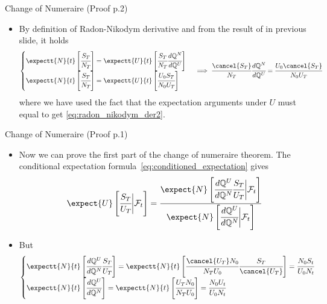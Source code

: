 \documentclass{beamer}
\begin{document}
\begin{frame}{Change of Numeraire (Proof p.2)}
	\begin{itemize}
	\item By definition of Radon-Nikodym derivative and from the result of in previous slide, it holds
  \begin{equation*}
  	\begin{cases}
    \expectt{N}{t}\left[\cfrac{S_T}{N_T}\right] =\expectt{U}{t}\left[\cfrac{S_T}{N_T} \cfrac{d\mathbb{Q}^N}{d\mathbb{Q}^U}\right] \\
    \expectt{N}{t}\left[\cfrac{S_T}{N_T}\right] =\expectt{U}{t}\left[\cfrac{U_0 S_T}{N_0 U_T}\right]
    \end{cases}\implies
	\cfrac{\cancel{S_T}}{N_T} \cfrac{d\mathbb{Q}^N}{d\mathbb{Q}^U} = \cfrac{U_0 \cancel{S_T}}{N_0 U_T}
  \end{equation*}
	where we have used the fact that the expectation arguments under $U$ must equal to get \cref{eq:radon_nikodym_der2}. 
  \end{itemize}
\end{frame}

\begin{frame}{Change of Numeraire (Proof p.1)}
  \begin{itemize}
  \item<1-> Now we can prove the first part of the change of numeraire theorem. The conditional expectation formula~\cref{eq:conditioned_expectation} gives
    \begin{equation*}
      \expect{U}\left[\cfrac{S_T}{U_T}\bigg|\mathcal{F}_t\right]=\cfrac{\expect{N}\left[\cfrac{d\mathbb{Q}^U}{d\mathbb{Q}^N}\cfrac{S_T}{U_T}\bigg|\mathcal{F}_t\right]}{\expect{N}\left[\cfrac{d\mathbb{Q}^U}{d\mathbb{Q}^N}\bigg|\mathcal{F}_t\right]}
    \end{equation*}
  \item<2-> But 
    \begin{equation*}
      \begin{cases}
	\expectt{N}{t}\left[\cfrac{d\mathbb{Q}^U}{d\mathbb{Q}^N}\cfrac{S_T}{U_T}\right]= \expectt{N}{t}\left[\cfrac{\cancel{U_T} N_0}{N_T U_0}\cfrac{S_T}{\cancel{U_T}}\right]=\cfrac{N_0 S_t}{U_0 N_t} \\
	\expectt{N}{t}\left[\cfrac{d\mathbb{Q}^U}{d\mathbb{Q}^N}\right]= \expectt{N}{t}\left[\cfrac{U_T N_0}{N_T U_0}\right] = \cfrac{N_0 U_t}{U_0 N_t}
      \end{cases}
    \end{equation*}
  \end{itemize}
\end{frame}	
\end{document}
